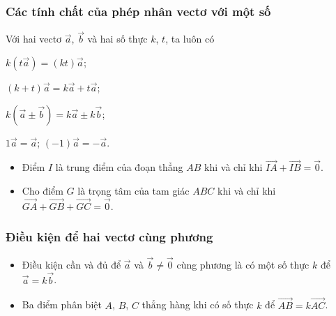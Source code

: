 \subsubsection{Các tính chất của phép nhân vectơ với một số}%
Với hai vectơ $\overrightarrow{a}$, $\overrightarrow{b}$ và hai số thực $k$, $t$, ta luôn có
\begin{enumEX}[$\bullet$]{2}
	\item $k(t \overrightarrow{a})=(k t) \overrightarrow{a}$;
	\item  $(k+t) \overrightarrow{a}=k \overrightarrow{a}+t \overrightarrow{a}$;
	\item $k(\overrightarrow{a}\pm\overrightarrow{b})=k \overrightarrow{a}\pm k \overrightarrow{b}$;
	\item $1\overrightarrow{a}=\overrightarrow{a}$; $(-1) \overrightarrow{a}=-\overrightarrow{a}$.
\end{enumEX}
\begin{itemize}
	\item Điểm $I$ là trung điểm của đoạn thẳng $AB$ khi và chỉ khi $\overrightarrow{IA}+\overrightarrow{IB}=\overrightarrow{0}$.
	\item Cho điểm $G$ là trọng tâm của tam giác $ABC$ khi và chỉ khi $\overrightarrow{GA}+\overrightarrow{GB}+\overrightarrow{GC}=\overrightarrow{0}$.
\end{itemize}

\subsubsection{Điều kiện để hai vectơ cùng phương}
\begin{itemize}
	\item [\ding{172}] Điều kiện cần và đủ để $\overrightarrow{a}$ và $\overrightarrow{b} \ne \overrightarrow{0}$ cùng phương là có một số thực $k$ để $\overrightarrow{a}=k\overrightarrow{b}$.
	\item [\ding{173}] Ba điểm phân biệt $A$, $B$, $C$ thẳng hàng khi có số thực $k$ để $\overrightarrow{AB}=k\overrightarrow{AC}$.
\end{itemize}
